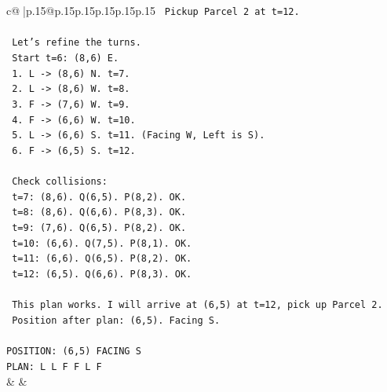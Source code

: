 \documentclass{article}
\begin{document}
{\begin{supertabular}{c@{$\;$}|p{.15\linewidth}@{}p{.15\linewidth}p{.15\linewidth}p{.15\linewidth}p{.15\linewidth}p{.15\linewidth}}
{{{\texttt{      Pickup Parcel 2 at t=12.} \\
\\ 
\texttt{   Let's refine the turns.} \\
\texttt{   Start t=6: (8,6) E.} \\
\texttt{   1. L {-}> (8,6) N. t=7.} \\
\texttt{   2. L {-}> (8,6) W. t=8.} \\
\texttt{   3. F {-}> (7,6) W. t=9.} \\
\texttt{   4. F {-}> (6,6) W. t=10.} \\
\texttt{   5. L {-}> (6,6) S. t=11. (Facing W, Left is S).} \\
\texttt{   6. F {-}> (6,5) S. t=12.} \\
\\ 
\texttt{   Check collisions:} \\
\texttt{   t=7: (8,6). Q(6,5). P(8,2). OK.} \\
\texttt{   t=8: (8,6). Q(6,6). P(8,3). OK.} \\
\texttt{   t=9: (7,6). Q(6,5). P(8,2). OK.} \\
\texttt{   t=10: (6,6). Q(7,5). P(8,1). OK.} \\
\texttt{   t=11: (6,6). Q(6,5). P(8,2). OK.} \\
\texttt{   t=12: (6,5). Q(6,6). P(8,3). OK.} \\
\\ 
\texttt{   This plan works. I will arrive at (6,5) at t=12, pick up Parcel 2.} \\
\texttt{   Position after plan: (6,5). Facing S.} \\
\\ 
\texttt{POSITION: (6,5) FACING S} \\
\texttt{PLAN: L L F F L F} \\
            }
        }
    }
    & & \\ \\


\end{supertabular}}
\end{document}
